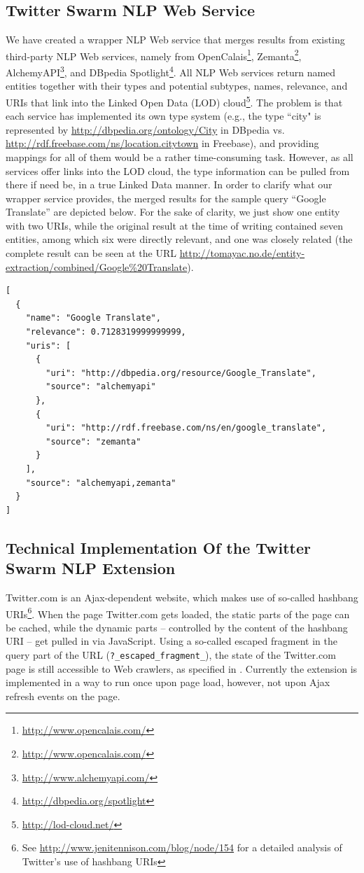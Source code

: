 \documentclass[runningheads,a4paper]{llncs}
\begin{document}
\subsection{Twitter Swarm NLP Web Service}\label{sec:webservice}
We have created a wrapper NLP Web service that merges results from existing third-party NLP Web services, namely from OpenCalais\footnote{\url{http://www.opencalais.com/}}, Zemanta\footnote{\url{http://www.opencalais.com/}}, AlchemyAPI\footnote{\url{http://www.alchemyapi.com/}}, and DBpedia Spotlight\footnote{\url{http://dbpedia.org/spotlight}}. All NLP Web services return named entities together with their types and potential subtypes, names, relevance, and URIs that link into the Linked Open Data (LOD) cloud\footnote{\url{http://lod-cloud.net/}}. The problem is that each service has implemented its own type system (e.g., the type ``city" is represented by \url{http://dbpedia.org/ontology/City} in DBpedia vs. \url{http://rdf.freebase.com/ns/location.citytown} in Freebase), and providing mappings for all of them would be a rather time-consuming task. However, as all services offer links into the LOD cloud, the type information can be pulled from there if need be, in a true Linked Data manner. In order to clarify what our wrapper service provides, the merged results for the sample query ``Google Translate'' are depicted below. For the sake of clarity, we just show one entity with two URIs, while the original result at the time of writing contained seven entities, among which six were directly relevant, and one was closely related (the complete result can be seen at the URL \url{http://tomayac.no.de/entity-extraction/combined/Google%20Translate}).

\begin{lstlisting}
[
  {
    "name": "Google Translate",
    "relevance": 0.7128319999999999,
    "uris": [
      {
        "uri": "http://dbpedia.org/resource/Google_Translate",
        "source": "alchemyapi"
      },
      {
        "uri": "http://rdf.freebase.com/ns/en/google_translate",
        "source": "zemanta"
      }
    ],
    "source": "alchemyapi,zemanta"
  }
]
\end{lstlisting}

\subsection{Technical Implementation Of the Twitter Swarm NLP Extension}
Twitter.com is an Ajax-dependent website, which makes use of so-called hashbang URIs\footnote{See \url{http://www.jenitennison.com/blog/node/154} for a detailed analysis of Twitter's use of hashbang URIs}. When the page Twitter.com gets loaded, the static parts of the page can be cached, while the dynamic parts -- controlled by the content of the hashbang URI -- get pulled in via JavaScript. Using a so-called escaped fragment in the query part of the URL (\texttt{?\_escaped\_fragment\_}), the state of the Twitter.com page is still accessible to Web crawlers, as specified in \cite{Google:Ajax}. Currently the extension is implemented in a way to run once upon page load, however, not upon Ajax refresh events on the page.
\end{document}
